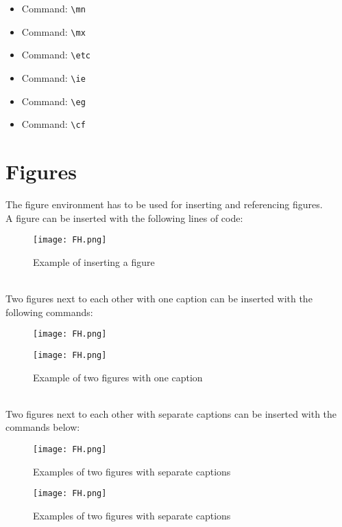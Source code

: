 \begin{multicols}{2}	
	\begin{itemize}
		\item Command: \verb|\mn|\dotfill\mn
		\item Command: \verb|\mx|\dotfill\mx
		\item Command: \verb|\etc|\dotfill\etc
		\item Command: \verb|\ie|\dotfill\ie
		\item Command: \verb|\eg|\dotfill\eg
		\item Command: \verb|\cf|\dotfill\cf
	\end{itemize}
\end{multicols}

\newpage
\section{Figures}
\label{sec: Figures}
The figure environment has to be used for inserting and referencing figures.\\
A figure can be inserted with the following lines of code:
\begin{figure}[h]
	\centering
	\texttt{[image: FH.png]}
	\caption{Example of inserting a figure}
	\label{fig: ExampleFigure-1}
\end{figure}\\
Two figures next to each other with one caption can be inserted with the following commands:
\begin{figure}[htp!]
	\begin{minipage}[t]{0.49\textwidth}
		\centering
		\texttt{[image: FH.png]}
	\end{minipage}
	\hfill
	\begin{minipage}[t]{0.49\textwidth}
		\centering
		\texttt{[image: FH.png]}
	\end{minipage}
	\caption{Example of two figures with one caption}
	\label{fig: ExampleFigure-2}
\end{figure}\\
Two figures next to each other with separate captions can be inserted with the commands below:
\begin{figure}[htp!]
	\begin{minipage}[t]{0.49\textwidth}
		\centering
		\texttt{[image: FH.png]}
		\caption{Examples of two figures with separate captions}
		\label{fig: ExampleFigure-3}
	\end{minipage}
	\hfill
	\begin{minipage}[t]{0.49\textwidth}
		\centering
		\texttt{[image: FH.png]}
		\caption{Examples of two figures with separate captions}
		\label{fig: ExampleFigure-4}
	\end{minipage}
\end{figure}\\
